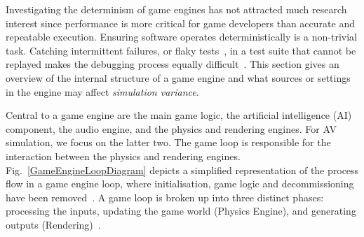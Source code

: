 \documentclass[letterpaper, 10 pt, journal, twoside]{IEEEtran}
\begin{document}
Investigating the determinism of game engines has not attracted much research interest since performance is more critical for game developers than accurate and repeatable execution.  %
%
Ensuring software operates deterministically is a non-trivial task.  Catching intermittent failures, or flaky tests~\cite{intermittently-failing-tests}, in a test suite that cannot be replayed makes the debugging process equally difficult~\cite{acm-q-rr-interview}.
%
%
%
This section gives an overview of the internal structure of a game engine and what sources or settings in the engine may affect \textit{simulation variance}.
%


Central to a game engine are the main game logic, the artificial intelligence (AI) component, the audio engine, and the physics and rendering engines. For AV simulation, we focus on the latter two.
%
The game loop is responsible for the interaction between the physics and rendering engines. Fig.~\ref{GameEngineLoopDiagram} depicts a simplified representation of the process flow in a game engine loop, where  initialisation, game logic and decommissioning have been removed~\cite{unity_event_execution}.
A game loop is broken up into three distinct phases: processing the inputs, updating the game world (Physics Engine), and generating outputs (Rendering)~\cite{GameEngineArchBook}.
\end{document}
